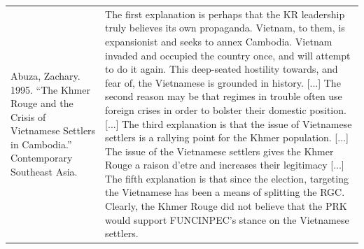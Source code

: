 {\begin{longtable}{p{}p{}}
Abuza, Zachary. 1995. “The Khmer Rouge and the Crisis of Vietnamese Settlers in Cambodia.” Contemporary Southeast Asia. & The first explanation is perhaps that the KR leadership truly believes its own propaganda. Vietnam, to them, is expansionist and seeks to annex Cambodia. Vietnam invaded and occupied the country once, and will attempt to do it again. This deep-seated hostility towards, and fear of, the Vietnamese is grounded in history. [...] The second reason may be that regimes in trouble often use foreign crises in order to bolster their domestic position. [...] The third explanation is that the issue of Vietnamese settlers is a rallying point for the Khmer population. [...] The issue of the Vietnamese settlers gives the Khmer Rouge a raison d'etre and increases their legitimacy [...] The fifth explanation is that since the election, targeting the Vietnamese has been a means of splitting the RGC. Clearly, the Khmer Rouge did not believe that the PRK would support FUNCINPEC's stance on the Vietnamese settlers.
\\

\end{longtable}}
